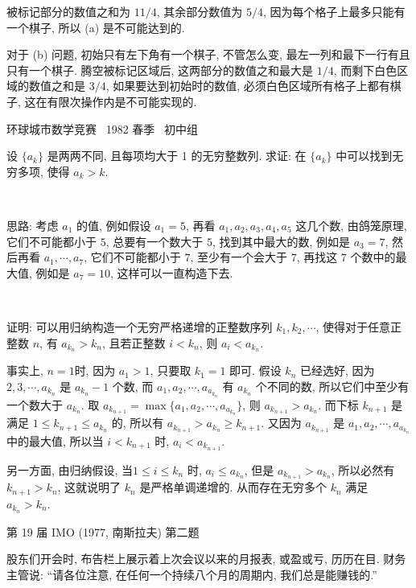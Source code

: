 被标记部分的数值之和为 $ 11/4 $, 其余部分数值为 $ 5/4 $, 因为每个格子上最多只能有一个棋子, 所以 (a) 是不可能达到的.

对于 (b) 问题, 初始只有左下角有一个棋子, 不管怎么变, 最左一列和最下一行有且只有一个棋子. 腾空被标记区域后, 这两部分的数值之和最大是 $ 1/4 $, 而剩下白色区域的数值之和是 $ 3/4 $, 如果要达到初始时的数值, 必须白色区域所有格子上都有棋子, 这在有限次操作内是不可能实现的.


\newpage
\noindent 环球城市数学竞赛~ 1982 春季~ 初中组

设 $\{a_k\}$ 是两两不同, 且每项均大于 1 的无穷整数列. 求证: 在 $\{a_k\}$ 中可以找到无穷多项, 使得 $a_k > k$.

~

思路: 考虑 $a_1$ 的值, 例如假设 $a_1 = 5$, 再看 $a_1, a_2, a_3, a_4, a_5$ 这几个数, 由鸽笼原理, 它们不可能都小于 $5$, 总要有一个数大于 $5$, 找到其中最大的数, 例如是 $a_3=7$, 然后再看 $a_1, \cdots, a_7$, 它们不可能都小于 $7$, 至少有一个会大于 $7$, 再找这 7 个数中的最大值, 例如是 $a_7 = 10$, 这样可以一直构造下去.

~

证明: 可以用归纳构造一个无穷严格递增的正整数序列 $k_1, k_2, \cdots$, 使得对于任意正整数 $n$, 有 $a_{k_n} > k_n$, 且若正整数 $i < k_n$, 则 $a_i < a_{k_n}$.

事实上, $n=1$时, 因为 $a_1 > 1$, 只要取 $k_1 = 1$ 即可. 假设 $k_n$ 已经选好, 因为 $2, 3, \cdots, a_{k_n}$ 是 $a_{k_n} - 1$ 个数, 而 $a_1, a_2, \cdots, a_{a_{k_n}}$ 有 $a_{k_n}$ 个不同的数, 所以它们中至少有一个数大于 $a_{k_n}$. 取 $a_{k_{n+1}} = \max\{a_1, a_2, \cdots, a_{a_{k_n}}\}$, 则 $a_{k_{n+1}} > a_{k_n}$. 而下标 $k_{n+1}$ 是满足 $1 \le k_{n+1} \le a_{k_n}$ 的, 所以有 $a_{k_{n+1}} > a_{k_n} \ge k_{n+1}$. 又因为 $a_{k_{n+1}}$ 是 $a_1, a_2, \cdots, a_{a_{k_n}}$ 中的最大值, 所以当 $i < k_{n+1}$ 时, $a_i < a_{k_{n+1}}$. 

另一方面, 由归纳假设, 当$1\le i \le k_n$ 时,  $a_i \le a_{k_n}$, 但是 $a_{k_{n+1}} > a_{k_n}$, 所以必然有 $k_{n+1} > k_n$, 这就说明了 $k_n$ 是严格单调递增的. 从而存在无穷多个 $k_n$ 满足 $a_{k_n} > k_n$.

\newpage
\noindent 第 19 届 IMO (1977, 南斯拉夫) 第二题

股东们开会时, 布告栏上展示着上次会议以来的月报表, 或盈或亏, 历历在目. 财务主管说: ``请各位注意, 在任何一个持续八个月的周期内, 我们总是能赚钱的.''

